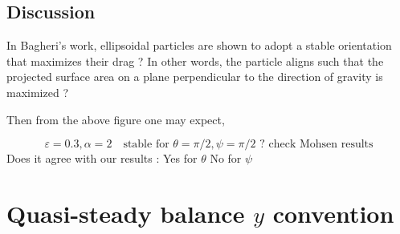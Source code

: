 \documentclass[12pt]{My_preprint}
\begin{document}
\subsection{Discussion}
In Bagheri's work, ellipsoidal particles are shown to adopt a stable orientation that maximizes their drag ?
In other words, the particle aligns such that the projected surface area on a plane perpendicular to the direction of gravity is maximized ?

Then from the above figure one may expect,

\begin{equation}
\varepsilon = 0.3, \alpha = 2 \quad \text{stable for $\theta = \pi/2, \psi =\pi /2$ ? check Mohsen results}
\end{equation}
Does it agree with our results :  Yes for $\theta $ No for $\psi$ 

\section{Quasi-steady balance $y$ convention}
\end{document}
